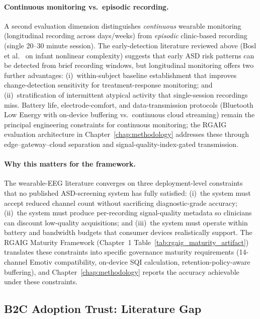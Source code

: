 \paragraph{Continuous monitoring vs.\ episodic recording.}
A second evaluation dimension distinguishes \emph{continuous} wearable monitoring (longitudinal recording across days/weeks) from \emph{episodic} clinic-based recording (single 20--30 minute session). The early-detection literature reviewed above (Bosl et al.~\cite{bosl2018eeg} on infant nonlinear complexity) suggests that early ASD risk patterns can be detected from brief recording windows, but longitudinal monitoring offers two further advantages: (i)~within-subject baseline establishment that improves change-detection sensitivity for treatment-response monitoring; and (ii)~stratification of intermittent atypical activity that single-session recordings miss. Battery life, electrode-comfort, and data-transmission protocols (Bluetooth Low Energy with on-device buffering vs.\ continuous cloud streaming) remain the principal engineering constraints for continuous monitoring; the RGAIG evaluation architecture in Chapter~\ref{chap:methodology} addresses these through edge--gateway--cloud separation and signal-quality-index-gated transmission.

\paragraph{Why this matters for the framework.}
The wearable-EEG literature converges on three deployment-level constraints that no published ASD-screening system has fully satisfied: (i)~the system must accept reduced channel count without sacrificing diagnostic-grade accuracy; (ii)~the system must produce per-recording signal-quality metadata so clinicians can discount low-quality acquisitions; and (iii)~the system must operate within battery and bandwidth budgets that consumer devices realistically support. The RGAIG Maturity Framework (Chapter~1 Table~\ref{tab:rgaig_maturity_artifact}) translates these constraints into specific governance maturity requirements (14-channel Emotiv compatibility, on-device SQI calculation, retention-policy-aware buffering), and Chapter~\ref{chap:methodology} reports the accuracy achievable under these constraints.

\subsection{B2C Adoption Trust: Literature Gap}
\label{subsec:b2c_adoption_trust_lit_gap}

